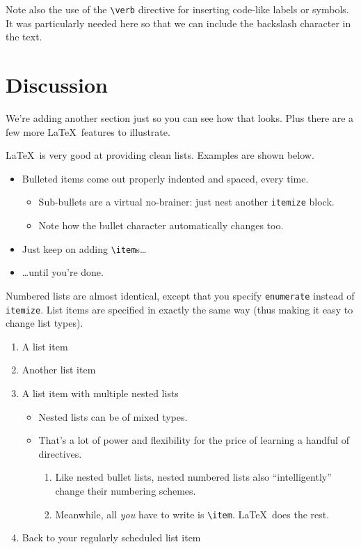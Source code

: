 \documentclass{article}
\begin{document}
Note also the use of the \verb!\verb! directive for inserting code-like labels or symbols.  It was particularly needed here so that we can include the backslash character in the text.

\section{Discussion}

We're adding another section just so you can see how that looks.  Plus there are a few more \LaTeX\ features to illustrate.

\LaTeX\ is very good at providing clean lists.  Examples are shown below.

\begin{itemize}
\item Bulleted items come out properly indented and spaced, every time.

\begin{itemize}
\item Sub-bullets are a virtual no-brainer: just nest another \verb!itemize! block.
\item Note how the bullet character automatically changes too.
\end{itemize}

\item Just keep on adding \verb!\item!s\ldots

\item \ldots until you're done.
\end{itemize}

Numbered lists are almost identical, except that you specify \verb!enumerate! instead of \verb!itemize!.  List items are specified in exactly the same way (thus making it easy to change list types).

\begin{enumerate}
\item A list item
\item Another list item
\item A list item with multiple nested lists

\begin{itemize}
\item Nested lists can be of mixed types.
\item That's a lot of power and flexibility for the price of learning a handful of directives.

\begin{enumerate}
\item Like nested bullet lists, nested numbered lists also ``intelligently'' change their numbering schemes.
\item Meanwhile, all \emph{you} have to write is \verb!\item!.  \LaTeX\ does the rest.
\end{enumerate}
\end{itemize}

\item Back to your regularly scheduled list item

\end{enumerate}
\end{document}
